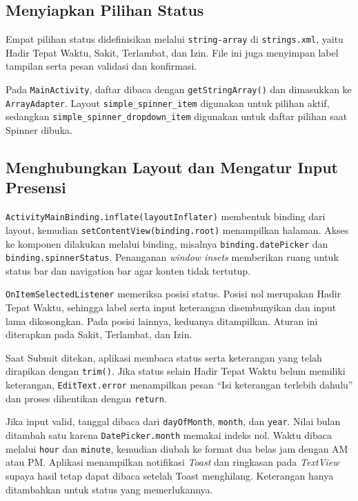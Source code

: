 \documentclass[a4paper,oneside,11pt]{book}
\begin{document}
\subsection{Menyiapkan Pilihan Status}
Empat pilihan status didefinisikan melalui \texttt{string-array} di \texttt{strings.xml}, yaitu Hadir Tepat Waktu, Sakit, Terlambat, dan Izin. File ini juga menyimpan label tampilan serta pesan validasi dan konfirmasi.


Pada \texttt{MainActivity}, daftar dibaca dengan \texttt{getStringArray()} dan dimasukkan ke \texttt{ArrayAdapter}. Layout \texttt{simple\_spinner\_item} digunakan untuk pilihan aktif, sedangkan \texttt{simple\_spinner\_dropdown\_item} digunakan untuk daftar pilihan saat Spinner dibuka.

\subsection{Menghubungkan Layout dan Mengatur Input Presensi}
\texttt{ActivityMainBinding.inflate(layoutInflater)} membentuk binding dari layout, kemudian \texttt{setContentView(binding.root)} menampilkan halaman. Akses ke komponen dilakukan melalui binding, misalnya \texttt{binding.datePicker} dan \texttt{binding.spinnerStatus}. Penanganan \textit{window insets} memberikan ruang untuk status bar dan navigation bar agar konten tidak tertutup.

\texttt{OnItemSelectedListener} memeriksa posisi status. Posisi nol merupakan Hadir Tepat Waktu, sehingga label serta input keterangan disembunyikan dan input lama dikosongkan. Pada posisi lainnya, keduanya ditampilkan. Aturan ini diterapkan pada Sakit, Terlambat, dan Izin.

Saat Submit ditekan, aplikasi membaca status serta keterangan yang telah dirapikan dengan \texttt{trim()}. Jika status selain Hadir Tepat Waktu belum memiliki keterangan, \texttt{EditText.error} menampilkan pesan ``Isi keterangan terlebih dahulu'' dan proses dihentikan dengan \texttt{return}.

Jika input valid, tanggal dibaca dari \texttt{dayOfMonth}, \texttt{month}, dan \texttt{year}. Nilai bulan ditambah satu karena \texttt{DatePicker.month} memakai indeks nol. Waktu dibaca melalui \texttt{hour} dan \texttt{minute}, kemudian diubah ke format dua belas jam dengan AM atau PM. Aplikasi menampilkan notifikasi \textit{Toast} dan ringkasan pada \textit{TextView} supaya hasil tetap dapat dibaca setelah Toast menghilang. Keterangan hanya ditambahkan untuk status yang memerlukannya.
\end{document}
